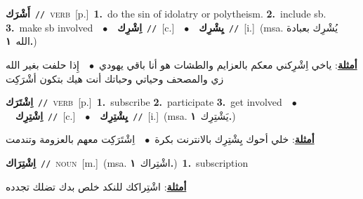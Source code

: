 \documentclass[10pt,a4paper,twoside]{article} %
\begin{document}
\begin{multicols}{2}
{\setlength\topsep{0pt}\textbf{\foreignlanguage{arabic}{أَشْرَك}}\ {\color{gray}\texttt{//}\color{black}}\ \textsc{verb}\ [p.]\ \textbf{1.}~do the sin of idolatry or polytheism.  \textbf{2.}~include sb.  \textbf{3.}~make sb involved\ \ $\bullet$\ \ \setlength\topsep{0pt}\textbf{\foreignlanguage{arabic}{اِشْرِك}}\ {\color{gray}\texttt{//}\color{black}}\ [c.]\ \ $\bullet$\ \ \setlength\topsep{0pt}\textbf{\foreignlanguage{arabic}{يِشْرِك}}\ {\color{gray}\texttt{//}\color{black}}\ [i.]\ \color{gray}(msa. \foreignlanguage{arabic}{يُشْرِك بعبادة الله}~\foreignlanguage{arabic}{\textbf{١.}})\color{black}\  \begin{flushright}\color{gray}\foreignlanguage{arabic}{\textbf{\underline{\foreignlanguage{arabic}{أمثلة}}}: ياخي اِشْرِكني معكم بالعزايم والطشات هو أنا باقي يهودي\ $\bullet$\ \  إِذا حلفت بغير الله زي والمصحف وحياتي وحباتك أنت هيك بتكون أشْرَكِت}\end{flushright}\color{black}} \vspace{2mm}

{\setlength\topsep{0pt}\textbf{\foreignlanguage{arabic}{اِشْتَرَك}}\ {\color{gray}\texttt{//}\color{black}}\ \textsc{verb}\ [p.]\ \textbf{1.}~subscribe  \textbf{2.}~participate  \textbf{3.}~get involved\ \ $\bullet$\ \ \setlength\topsep{0pt}\textbf{\foreignlanguage{arabic}{اِشْتِرِك}}\ {\color{gray}\texttt{//}\color{black}}\ [c.]\ \ $\bullet$\ \ \setlength\topsep{0pt}\textbf{\foreignlanguage{arabic}{يِشْتِرِك}}\ {\color{gray}\texttt{//}\color{black}}\ [i.]\ \color{gray}(msa. \foreignlanguage{arabic}{يَشْتِرِك}~\foreignlanguage{arabic}{\textbf{١.}})\color{black}\  \begin{flushright}\color{gray}\foreignlanguage{arabic}{\textbf{\underline{\foreignlanguage{arabic}{أمثلة}}}: خلي أحوك يِشْتِرِك بالانترنت بكرة\ $\bullet$\ \  اِشْتَرَكِت معهم بالعزومة وتندمت}\end{flushright}\color{black}} \vspace{2mm}

{\setlength\topsep{0pt}\textbf{\foreignlanguage{arabic}{اِشْتِرَاك}}\ {\color{gray}\texttt{//}\color{black}}\ \textsc{noun}\ [m.]\ \color{gray}(msa. \foreignlanguage{arabic}{اشْتِراك}~\foreignlanguage{arabic}{\textbf{١.}})\color{black}\ \textbf{1.}~subscription\  \begin{flushright}\color{gray}\foreignlanguage{arabic}{\textbf{\underline{\foreignlanguage{arabic}{أمثلة}}}: اشْتِراكك للنكد خلص بدك تضلك تجدده}\end{flushright}\color{black}} \vspace{2mm}


\end{multicols}
\end{document}

